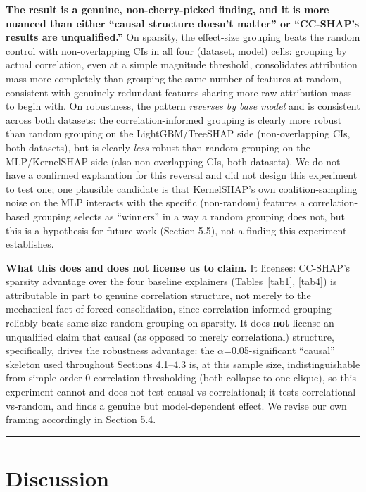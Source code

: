 \textbf{The result is a genuine, non-cherry-picked finding, and it is more nuanced than either ``causal structure doesn't matter'' or ``CC-SHAP's results are unqualified.''} On sparsity, the effect-size grouping beats the random control with non-overlapping CIs in all four (dataset, model) cells: grouping by actual correlation, even at a simple magnitude threshold, consolidates attribution mass more completely than grouping the same number of features at random, consistent with genuinely redundant features sharing more raw attribution mass to begin with. On robustness, the pattern \emph{reverses by base model} and is consistent across both datasets: the correlation-informed grouping is clearly more robust than random grouping on the LightGBM/TreeSHAP side (non-overlapping CIs, both datasets), but is clearly \emph{less} robust than random grouping on the MLP/KernelSHAP side (also non-overlapping CIs, both datasets). We do not have a confirmed explanation for this reversal and did not design this experiment to test one; one plausible candidate is that KernelSHAP's own coalition-sampling noise on the MLP interacts with the specific (non-random) features a correlation-based grouping selects as ``winners'' in a way a random grouping does not, but this is a hypothesis for future work (Section 5.5), not a finding this experiment establishes.

\textbf{What this does and does not license us to claim.} It licenses: CC-SHAP's sparsity advantage over the four baseline explainers (Tables~\ref{tab1}, \ref{tab4}) is attributable in part to genuine correlation structure, not merely to the mechanical fact of forced consolidation, since correlation-informed grouping reliably beats same-size random grouping on sparsity. It does \textbf{not} license an unqualified claim that causal (as opposed to merely correlational) structure, specifically, drives the robustness advantage: the $\alpha$=0.05-significant ``causal'' skeleton used throughout Sections 4.1--4.3 is, at this sample size, indistinguishable from simple order-0 correlation thresholding (both collapse to one clique), so this experiment cannot and does not test causal-vs-correlational; it tests correlational-vs-random, and finds a genuine but model-dependent effect. We revise our own framing accordingly in Section 5.4.

\begin{center}\rule{0.5\linewidth}{0.5pt}\end{center}

\section{Discussion}\label{discussion}

